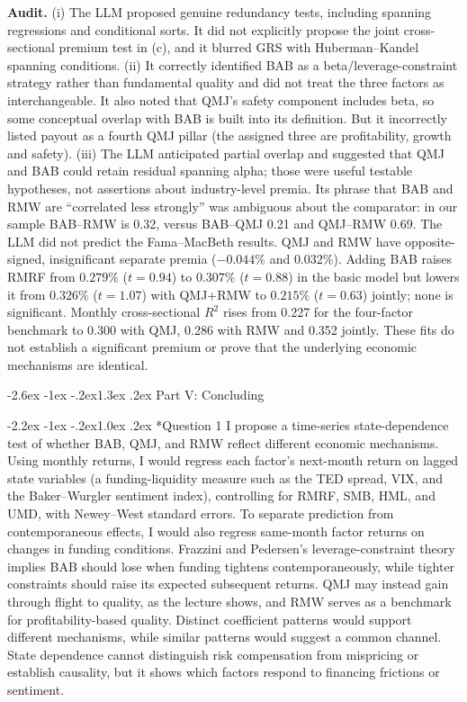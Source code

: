 \documentclass[11pt]{article}
\makeatletter
\renewcommand\section{\@startsection{section}{1}{0pt}%
  {-2.6ex \@plus -1ex \@minus -.2ex}{1.3ex \@plus .2ex}%
  {\normalfont\scshape\large\color{psink}}}   %
\renewcommand\subsection{\@startsection{subsection}{2}{0pt}%
  {-2.2ex \@plus -1ex \@minus -.2ex}{1.0ex \@plus .2ex}%
  {\normalfont\bfseries\normalsize\color{psink}}}
\makeatother
\begin{document}
\noindent\textbf{Audit.} (i) The LLM proposed genuine redundancy tests, including
spanning regressions and conditional sorts. It did not explicitly propose the
joint cross-sectional premium test in (c), and it blurred GRS with
Huberman--Kandel spanning conditions.
(ii) It correctly identified BAB as a beta/leverage-constraint strategy rather
than fundamental quality and did not treat the three factors as interchangeable.
It also noted that QMJ's safety component includes beta, so some conceptual
overlap with BAB is built into its definition. But it incorrectly listed payout
as a fourth QMJ pillar (the assigned three are profitability, growth and safety).
(iii) The LLM anticipated partial overlap and suggested that QMJ and BAB
could retain residual spanning alpha; those were useful testable hypotheses,
not assertions about industry-level premia. Its phrase that BAB and RMW
are ``correlated less strongly'' was ambiguous about the comparator: in our
sample BAB--RMW is 0.32, versus BAB--QMJ 0.21 and QMJ--RMW 0.69.
The LLM did not predict the Fama--MacBeth results. QMJ and RMW have opposite-
signed, insignificant separate premia ($-0.044\%$ and $0.032\%$). Adding BAB
raises RMRF from $0.279\%$ ($t=0.94$) to $0.307\%$ ($t=0.88$) in the basic
model but lowers it from $0.326\%$ ($t=1.07$) with QMJ+RMW to $0.215\%$
($t=0.63$) jointly; none is significant. Monthly cross-sectional $R^2$ rises
from 0.227 for the four-factor benchmark to 0.300 with QMJ, 0.286 with RMW
and 0.352 jointly. These fits do not establish a significant premium or prove
that the underlying economic mechanisms are identical.


\section{Part V: Concluding}

\subsection*{Question 1}
I propose a time-series state-dependence test of whether BAB, QMJ, and RMW reflect different economic mechanisms. Using monthly returns, I would regress each factor's next-month return on lagged state variables (a funding-liquidity measure such as the TED spread, VIX, and the Baker--Wurgler sentiment index), controlling for RMRF, SMB, HML, and UMD, with Newey--West standard errors. To separate prediction from contemporaneous effects, I would also regress same-month factor returns on changes in funding conditions. Frazzini and Pedersen's leverage-constraint theory implies BAB should lose when funding tightens contemporaneously, while tighter constraints should raise its expected subsequent returns. QMJ may instead gain through flight to quality, as the lecture shows, and RMW serves as a benchmark for profitability-based quality. Distinct coefficient patterns would support different mechanisms, while similar patterns would suggest a common channel. State dependence cannot distinguish risk compensation from mispricing or establish causality, but it shows which factors respond to financing frictions or sentiment.
\end{document}
